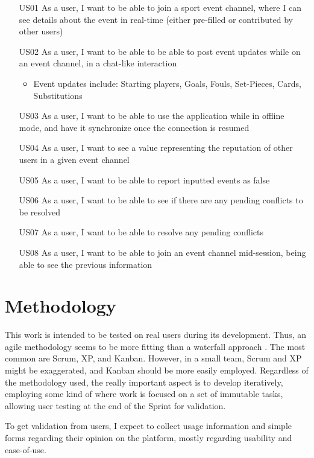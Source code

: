 \begin{itemize}[leftmargin  = 3.25\parindent, align=left]
    \item[US01] As a user, I want to be able to join a sport event channel, where I can see details about the event in real-time (either pre-filled or contributed by other users)
    \item[US02] As a user, I want to be able to be able to post event updates while on an event channel, in a chat-like interaction
    \begin{itemize}
        \item Event updates include: Starting players, Goals, Fouls, Set-Pieces, Cards, Substitutions
    \end{itemize} 
    \item[US03] As a user, I want to be able to use the application while in offline mode, and have it synchronize once the connection is resumed
    \item[US04] As a user, I want to see a value representing the reputation of other users in a given event channel
    \item[US05] As a user, I want to be able to report inputted events as false
    \item[US06] As a user, I want to be able to see if there are any pending conflicts to be resolved
    \item[US07] As a user, I want to be able to resolve any pending conflicts
    \item[US08] As a user, I want to be able to join an event channel mid-session, being able to see the previous information
\end{itemize}


\section{Methodology}\label{sec:prob-methodology}

This work is intended to be tested on real users during its development. Thus, an agile methodology seems to be more fitting than a waterfall approach \cite{beck2001agile}. The most common are Scrum, XP, and Kanban. However, in a small team, Scrum and XP might be exaggerated, and Kanban should be more easily employed. Regardless of the methodology used, the really important aspect is to develop iteratively, employing some kind of  where work is focused on a set of immutable tasks, allowing user testing at the end of the Sprint for validation. 

To get validation from users, I expect to collect usage information and simple forms regarding their opinion on the platform, mostly regarding usability and ease-of-use. 

